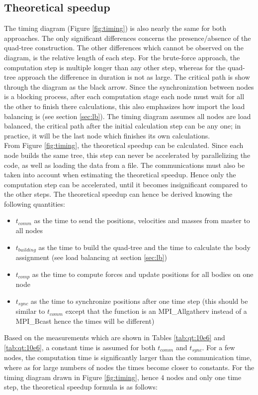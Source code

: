 \subsection{Theoretical speedup}
The timing diagram (Figure \ref{fig:timing}) is also nearly the same for both approaches. The only significant differences concerns the presence/absence of the quad-tree construction. The other differences which cannot be observed on the diagram, is the relative length of each step. For the brute-force approach, the computation step is multiple longer than any other step, whereas for the quad-tree approach the difference in duration is not as large. The critical path is show through the diagram as the black arrow. Since the synchronization between nodes is a blocking process, after each computation stage each node must wait for all the other to finish there calculations, this also emphasizes how import the load balancing is (see section \ref{sec:lb}). The timing diagram assumes all nodes are load balanced, the critical path after the initial calculation step can be any one; in practice, it will be the last node which finishes its own calculations.\\
From Figure \ref{fig:timing}, the theoretical speedup can be calculated. Since each node builds the same tree, this step can never be accelerated by parallelizing the code, as well as loading the data from a file. The communications must also be taken into account when estimating the theoretical speedup. Hence only the computation step can be accelerated, until it becomes insignificant compared to the other steps. The theoretical speedup can hence be derived knowing the following quantities:
\begin{itemize}
\item $t_{comm}$ as the time to send the positions, velocities and masses from master to all nodes
\item  $t_{building}$ as the time to build the quad-tree and the time to calculate the body assignment (see load balancing at section \ref{sec:lb})
\item $t_{comp}$ as the time to compute forces and update positions for all bodies on one node
\item $t_{sync}$ as the time to synchronize positions after one time step (this should be similar to $t_{comm}$ except that the function is an MPI\_Allgatherv instead of a MPI\_Bcast hence the times will be different)
\end{itemize}
Based on the measurements which are shown in Tables \ref{tab:qt:10e6} and \ref{tab:qt:10e6}, a constant time is assumed for both $t_{comm}$ and $t_{sync}$. For a few nodes, the computation time is significantly larger than the communication time, where as for large numbers of nodes the times become closer to constants. For the timing diagram drawn in Figure \ref{fig:timing}, hence 4 nodes and only one time step, the theoretical speedup formula is as follows:
